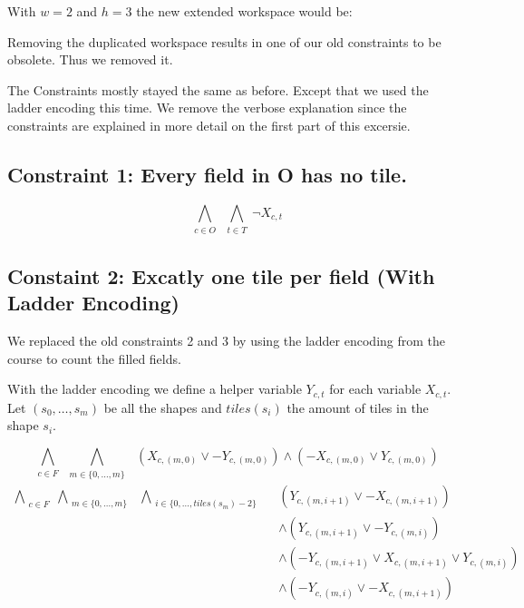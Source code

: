 \documentclass{base}
\begin{document}
With $w=2$ and $h=3$ the new extended workspace would be:
\begin{center}
\end{center}

Removing the duplicated workspace results in one of our old constraints to be obsolete. Thus we removed it.

The Constraints mostly stayed the same as before. Except that we used the ladder encoding this time.
We remove the verbose explanation since the constraints are explained in more detail on the first part of this excersie.


\subsection*{Constraint 1: Every field in O has no tile.}
$$\bigwedge_{\substack{c \in O}} \bigwedge_{\substack{t \in T}} \neg X_{c,t}$$

\subsection*{Constaint 2: Excatly one tile per field (With Ladder Encoding)}
We replaced the old constraints 2 and 3 by using the ladder encoding from the course to count the filled fields.

With the ladder encoding we define a helper variable $Y_{c,t}$ for each variable $X_{c,t}$.
Let $(s_0,\dots,s_m)$ be all the shapes and $tiles(s_i)$ the amount of tiles in the shape $s_i$.

$$ \bigwedge_{\substack{c \in F}} \bigwedge_{\substack{m \in \{0,\dots,m\}}}\ \  (X_{c,(m, 0)} \lor -Y_{c,(m, 0)}) \land (-X_{c,(m, 0)} \lor Y_{c,(m, 0)}) $$
\begin{align}
    \bigwedge_{\substack{c \in F}} \bigwedge_{\substack{m \in \{0,\dots,m\}}}\ \ \bigwedge_{\substack{i \in \{0,\dots,tiles(s_m)-2\}}}\ \  &(Y_{c,(m, i+1)} \lor -X_{c,(m, i+1)}) \\
    & \land (Y_{c,(m, i+1)} \lor -Y_{c,(m, i)}) \\
    & \land (-Y_{c,(m, i+1)} \lor X_{c,(m, i+1)} \lor Y_{c,(m, i)}) \\
    & \land (-Y_{c,(m, i)} \lor -X_{c,(m, i+1)})
\end{align}
\end{document}
